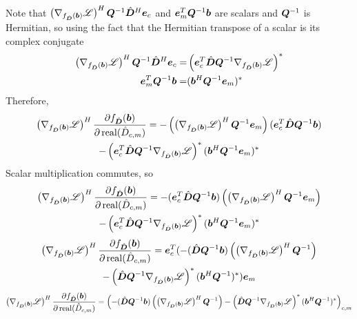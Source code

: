 \begin{appendices}
Note that $\left(\nabla_{f_{\hat{\bm{D}}}(\bm{b})} \mathscr{L}\right)^H\bm{Q}^{-1}\hat{\bm{D}}^H\bm{e}_c$ and $\bm{e}_m^T\bm{Q}^{-1}\bm{b}$ are scalars and $\bm{Q}^{-1}$ is Hermitian, so using the fact that the Hermitian transpose of a scalar is its complex conjugate
\begin{equation}
\begin{split}
\left(\nabla_{f_{\hat{\bm{D}}}(\bm{b})} \mathscr{L}\right)^H\bm{Q}^{-1}\hat{\bm{D}}^H\bm{e}_c = & \left(\bm{e}_c^T\hat{\bm{D}}\bm{Q}^{-1}\nabla_{f_{\hat{\bm{D}}}(\bm{b})} \mathscr{L}\right)^*
\\
\bm{e}_m^T\bm{Q}^{-1}\bm{b} = & (\bm{b}^H\bm{Q}^{-1}\bm{e}_m)^*
\end{split}
\end{equation}
Therefore,
\begin{multline}
\left(\nabla_{f_{\hat{\bm{D}}}(\bm{b})} \mathscr{L}\right)^H\frac{\partial f_{\hat{\bm{D}}}(\bm{b})}{\partial \operatorname{real}(\hat{D}_{c,m})} = -\left(\left(\nabla_{f_{\hat{\bm{D}}}(\bm{b})} \mathscr{L}\right)^H\bm{Q}^{-1}\bm{e}_m\right)(\bm{e}_c^T\hat{\bm{D}}\bm{Q}^{-1}\bm{b}) \\- \left(\bm{e}_c^T\hat{\bm{D}}\bm{Q}^{-1}\nabla_{f_{\hat{\bm{D}}}(\bm{b})} \mathscr{L}\right)^* (\bm{b}^H\bm{Q}^{-1}\bm{e}_m)^*
\end{multline}
Scalar multiplication commutes, so
\begin{multline}
\left(\nabla_{f_{\hat{\bm{D}}}(\bm{b})} \mathscr{L}\right)^H\frac{\partial f_{\hat{\bm{D}}}(\bm{b})}{\partial \operatorname{real}(\hat{D}_{c,m})} = -(\bm{e}_c^T\hat{\bm{D}}\bm{Q}^{-1}\bm{b})\left(\left(\nabla_{f_{\hat{\bm{D}}}(\bm{b})} \mathscr{L}\right)^H\bm{Q}^{-1}\bm{e}_m\right) \\- \left(\bm{e}_c^T\hat{\bm{D}}\bm{Q}^{-1}\nabla_{f_{\hat{\bm{D}}}(\bm{b})} \mathscr{L}\right)^* (\bm{b}^H\bm{Q}^{-1}\bm{e}_m)^*
\end{multline}
\begin{multline}
\left(\nabla_{f_{\hat{\bm{D}}}(\bm{b})} \mathscr{L}\right)^H\frac{\partial f_{\hat{\bm{D}}}(\bm{b})}{\partial \operatorname{real}(\hat{D}_{c,m})} = \bm{e}_c^T(-(\hat{\bm{D}}\bm{Q}^{-1}\bm{b})\left(\left(\nabla_{f_{\hat{\bm{D}}}(\bm{b})} \mathscr{L}\right)^H\bm{Q}^{-1}\right) \\- \left(\hat{\bm{D}}\bm{Q}^{-1}\nabla_{f_{\hat{\bm{D}}}(\bm{b})} \mathscr{L}\right)^* (\bm{b}^H\bm{Q}^{-1})^*)\bm{e}_m
\end{multline}
\begin{equation}
\left(\nabla_{f_{\hat{\bm{D}}}(\bm{b})} \mathscr{L}\right)^H\frac{\partial f_{\hat{\bm{D}}}(\bm{b})}{\partial \operatorname{real}(\hat{D}_{c,m})} = \left(-(\hat{\bm{D}}\bm{Q}^{-1}\bm{b})\left(\left(\nabla_{f_{\hat{\bm{D}}}(\bm{b})} \mathscr{L}\right)^H\bm{Q}^{-1}\right) - \left(\hat{\bm{D}}\bm{Q}^{-1}\nabla_{f_{\hat{\bm{D}}}(\bm{b})} \mathscr{L}\right)^* (\bm{b}^H\bm{Q}^{-1})^*\right)_{c,m}
\end{equation}


\end{appendices}
